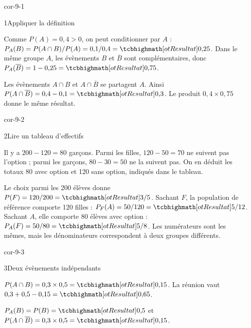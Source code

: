 \corrigesSouples

\begin{blocLivre}{cor-9-1}
\begin{corrige}{1}{Appliquer la définition}
\begin{questions}
\item Comme $P(A)=0{,}4>0$, on peut conditionner par $A$ :
$P_A(B)=P(A\cap B)/P(A)=0{,}1/0{,}4=\res{0{,}25}$.
Dans le même groupe $A$, les évènements $B$ et $\overline B$ sont complémentaires,
donc $P_A(\overline B)=1-0{,}25=\res{0{,}75}$.
\item Les évènements $A\cap B$ et $A\cap\overline B$ se partagent $A$.
Ainsi $P(A\cap\overline B)=0{,}4-0{,}1=\res{0{,}3}$.
Le produit $0{,}4\times0{,}75$ donne le même résultat.
\end{questions}

\end{corrige}
\end{blocLivre}
\begin{blocLivre}{cor-9-2}
\begin{corrige}{2}{Lire un tableau d'effectifs}
\begin{questions}
\item Il y a $200-120=80$ garçons.
Parmi les filles, $120-50=70$ ne suivent pas l’option ; parmi les garçons, $80-30=50$ ne la suivent pas.
On en déduit les totaux 80 avec option et 120 sans option, indiqués dans le tableau.
\item Le choix parmi les 200 élèves donne $P(F)=120/200=\res{3/5}$.
Sachant $F$, la population de référence comporte 120 filles : $P_F(A)=50/120=\res{5/12}$.
Sachant $A$, elle comporte 80 élèves avec option : $P_A(F)=50/80=\res{5/8}$.
Les numérateurs sont les mêmes, mais les dénominateurs correspondent à deux groupes différents.
\end{questions}

\label{figlivre-r09-02-cor}

\end{corrige}
\end{blocLivre}
\begin{blocLivre}{cor-9-3}
\begin{corrige}{3}{Deux évènements indépendants}
\begin{questions}
\item $P(A\cap B)=0{,}3\times0{,}5=\res{0{,}15}$. La réunion vaut $0{,}3+0{,}5-0{,}15=\res{0{,}65}$.
\item $P_A(B)=P(B)=\res{0{,}5}$ et $P(A\cap\overline B)=0{,}3\times0{,}5=\res{0{,}15}$.
\end{questions}
\end{corrige}
\end{blocLivre}
